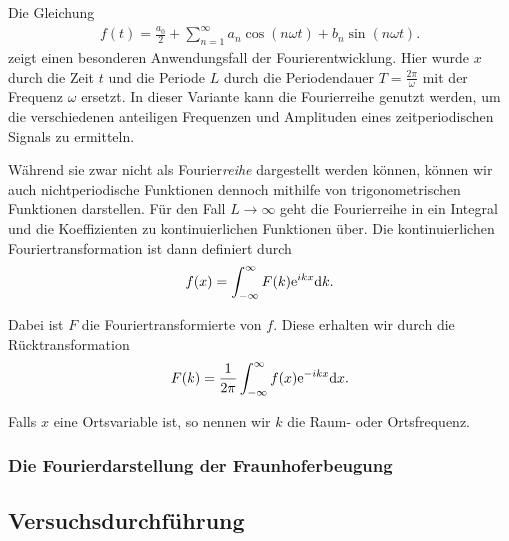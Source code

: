 Die Gleichung
\begin{align}
  f(t) = \frac{a_0}{2} + \sum_{n=1}^{\infty} a_n \cos(n\omega t) + b_n \sin(n\omega t).
\end{align}
zeigt einen besonderen Anwendungsfall der Fourierentwicklung. Hier wurde $x$ durch die Zeit $t$ und die Periode $L$ durch die Periodendauer $T = \frac{2\pi}{\omega}$ mit der Frequenz $\omega$ ersetzt. In dieser Variante kann die Fourierreihe genutzt werden, um die verschiedenen anteiligen Frequenzen und Amplituden eines zeitperiodischen Signals zu ermitteln.

Während sie zwar nicht als Fourier\textit{reihe} dargestellt werden können, können wir auch nichtperiodische Funktionen dennoch mithilfe von trigonometrischen Funktionen darstellen. Für den Fall $L\to\infty$ geht die Fourierreihe in ein Integral und die Koeffizienten zu kontinuierlichen Funktionen über. Die kontinuierlichen Fouriertransformation ist dann definiert durch
\begin{align}
  f(x) = \int_{-\infty}^{\infty} F(k) \text{e}^{ikx} \dd k.
\end{align}

Dabei ist $F$ die Fouriertransformierte von $f$. Diese erhalten wir durch die Rücktransformation
\begin{align}
  F(k) = \frac{1}{2\pi} \int_{-\infty}^{\infty} f(x) \text{e}^{-ikx} \dd x.
\end{align}

Falls $x$ eine Ortsvariable ist, so nennen wir $k$ die Raum- oder Ortsfrequenz.

\subsubsection*{Die Fourierdarstellung der Fraunhoferbeugung}

\newpage
\subsection{Versuchsdurchführung}